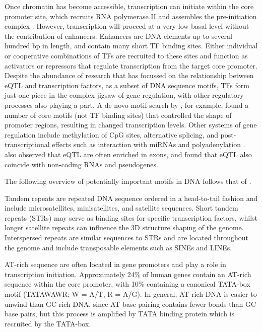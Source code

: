 \documentclass[12pt]{article}
\begin{document}
Once chromatin has become accessible, transcription can initiate within the core promoter site, which recruits RNA polymerase II and assembles the pre-initiation complex \citep{zabidi2016regulatory}. However, transcription will proceed at a very low basal level without the contribution of enhancers. Enhancers are DNA elements up to several hundred bp in length, and contain many short TF binding sites. Either individual or cooperative combinations of TFs are recruited to these sites and function as activators or repressors that regulate transcription from the target core promoter. Despite the abundance of research that has focussed on the relationship between eQTL and transcription factors, as a subset of DNA sequence motifs, TFs form just one piece in the complex jigsaw of gene regulation, with other regulatory processes also playing a part. A de novo motif search by \citet{schor2017promoter}, for example, found a number of core motifs (not TF binding sites) that controlled the shape of promoter regions, resulting in changed transcription levels. Other systems of gene regulation include methylation of CpG sites, alternative splicing, and post-transcriptional effects such as interaction with miRNAs and polyadenylation \citep{gaffney2013global}. \citet{gaffney2013global} also observed that eQTL are often enriched in exons, and \citet{kirsten2015dissecting} found that eQTL also coincide with non-coding RNAs and pseudogenes.
 
The following overview of potentially important motifs in DNA follows that of \citet{boeva2016analysis}. 

Tandem repeats are repeated DNA sequence ordered in a head-to-tail fashion and include microsatellites, minisatellites, and satellite sequences. Short tandem repeats (STRs) may serve as binding sites for specific transcription factors, whilst longer satellite repeats can influence the 3D structure shaping of the genome. Interspersed repeats are similar sequences to STRs and are located throughout the genome and include transposable elements such as SINEs and LINEs. 

AT-rich sequence are often located in gene promoters and play a role in transcription initiation. Approximately 24\% of human genes contain an AT-rich sequence within the core promoter, with 10\% containing a canonical TATA-box motif (TATAWAWR; W = A/T, R = A/G). In general, AT-rich DNA is easier to unwind than GC-rich DNA, since AT base pairing contains fewer bonds than GC base pairs, but this process is amplified by TATA binding protein which is recruited by the TATA-box. 
\end{document}
